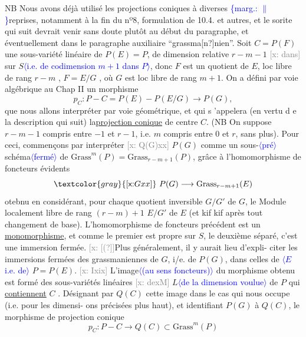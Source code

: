 \documentclass[11pt]{article}
\newcommand{\scanpage}[1]{\par\bigskip\noindent{\small\sffamily[scan #1]}\par}
\newcommand{\mspage}[1]{{\small\sffamily[p.\,#1]}}
\newcommand{\hand}[1]{\textcolor{blue}{#1}}
\newcommand{\inserted}[2][]{\textcolor{blue}{$\langle$#2$\rangle$}}
\newcommand{\margin}[1]{\textcolor{blue}{\{\textsf{marg.:} #1\}}}
\newcommand{\xout}[1]{\textcolor{gray}{[\textsf{x:} #1]}}
\newcommand{\uline}[1]{\underline{#1}}
\newcommand{\unsure}[1]{[#1?]}
\begin{document}
NB Nous avons déjà utilisé les projections coniques à diverses
\margin{$\|$}reprises, notamment à la fin du nº8, formulation de 10.4. et autres, et
le sorite qui suit devrait venir sans doute plutôt au début du paragraphe,
et éventuellement dans le paragraphe auxiliaire ``grassma\unsure{n}nien''.
Soit $C = P(F)$ une sous-variété linéaire de $P(E)=P$, de dimension
relative $r-m-1$ \xout{dans} sur $S$\inserted[typed]{i.e. de codimension $m+1$ dans $P$}, donc $F$ est un quotient de $E$, loc libre de
rang $r-m$ , $F=E/G$ , où $G$ est loc libre de rang $m+1$. On a défini
par voie algébrique au Chap II un morphisme
\[ p_C : P - C = P(E) - P(E/G) \longrightarrow P(G) , \]
que nous allons interpréter par voie géométrique, et qui s 'appelera
(en vertu d e la description qui suit) la\uline{projection conique} de centre $C$.
(NB On suppose $r-m-1$ compris entre $-1$ et $r-1$, i.e. $m$ compris entre $0$
et $r$, sans plus). Pour ceci, commençons par interpréter \xout{Q(G)xx} $P(G)$
comme un sous-\inserted{pré}schéma\inserted{fermé} de $\mathrm{Grass}^m(P)= \mathrm{Grass}_{r-m+1}(P)$, grâce à l'homomorphisme
de foncteurs évidents
\[ \xout{Gxx}\ P(G) \longrightarrow \mathrm{Grass}_{r-m+1}(E) \]
otebnu en considérant, pour chaque quotient inversible $G/G'$ de $G$, le
Module localement libre de rang $(r-m)+1$ $E/G'$ de $E$ (et kif kif après
tout changement de base). L'homomorphisme de foncteurs précédent est un
\uline{monomorphisme}, et comme le premier est propre sur $S$, le deuxième séparé,
c'est une immersion fermée. \xout{\unsure{(}}Plus généralement, il y aurait lieu d'expli-%
citer les immersions fermées des grassmaniennes de $G$, i/e. de $P(G)$,
dans celles de \inserted{$E$ i.e. de} $P=P(E)$. \xout{Ixix} L'image\inserted[typed]{(au sens foncteurs)} du morphisme obtenu est formé des
sous-variétés linéaires \xout{dexM} $L$\inserted[typed]{de la dimension voulue} de $P$ qui \uline{contiennent} $C$ . Désignant
par $Q(C)$ cette image dans le cas qui nous occupe (i.e. pour les dimensi-%
ons précisées plus haut), et identifiant $P(G)$ à $Q(C)$, le morphisme
de projection conique
\[ p_C : P - C \longrightarrow Q(C) \subset \mathrm{Grass}^m(P) \]

\mspage{\hand{84}}

\clearpage
\scanpage{25/85}
\mspage{79}
\end{document}
